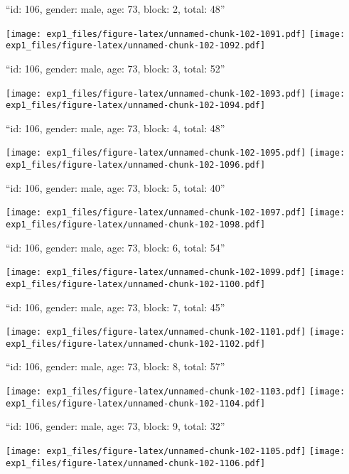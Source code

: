 \documentclass[11pt,,]{article}
\begin{document}
\newpage
[1] 

``id: 106, gender: male, age: 73, block: 2, total: 48''

\texttt{[image: exp1\_files/figure-latex/unnamed-chunk-102-1091.pdf]}
\texttt{[image: exp1\_files/figure-latex/unnamed-chunk-102-1092.pdf]}

\newpage
[1] 

``id: 106, gender: male, age: 73, block: 3, total: 52''

\texttt{[image: exp1\_files/figure-latex/unnamed-chunk-102-1093.pdf]}
\texttt{[image: exp1\_files/figure-latex/unnamed-chunk-102-1094.pdf]}

\newpage
[1] 

``id: 106, gender: male, age: 73, block: 4, total: 48''

\texttt{[image: exp1\_files/figure-latex/unnamed-chunk-102-1095.pdf]}
\texttt{[image: exp1\_files/figure-latex/unnamed-chunk-102-1096.pdf]}

\newpage
[1] 

``id: 106, gender: male, age: 73, block: 5, total: 40''

\texttt{[image: exp1\_files/figure-latex/unnamed-chunk-102-1097.pdf]}
\texttt{[image: exp1\_files/figure-latex/unnamed-chunk-102-1098.pdf]}

\newpage
[1] 

``id: 106, gender: male, age: 73, block: 6, total: 54''

\texttt{[image: exp1\_files/figure-latex/unnamed-chunk-102-1099.pdf]}
\texttt{[image: exp1\_files/figure-latex/unnamed-chunk-102-1100.pdf]}

\newpage
[1] 

``id: 106, gender: male, age: 73, block: 7, total: 45''

\texttt{[image: exp1\_files/figure-latex/unnamed-chunk-102-1101.pdf]}
\texttt{[image: exp1\_files/figure-latex/unnamed-chunk-102-1102.pdf]}

\newpage
[1] 

``id: 106, gender: male, age: 73, block: 8, total: 57''

\texttt{[image: exp1\_files/figure-latex/unnamed-chunk-102-1103.pdf]}
\texttt{[image: exp1\_files/figure-latex/unnamed-chunk-102-1104.pdf]}

\newpage
[1] 

``id: 106, gender: male, age: 73, block: 9, total: 32''

\texttt{[image: exp1\_files/figure-latex/unnamed-chunk-102-1105.pdf]}
\texttt{[image: exp1\_files/figure-latex/unnamed-chunk-102-1106.pdf]}
\end{document}
